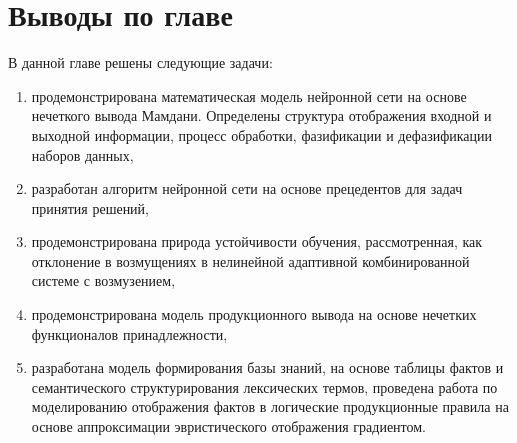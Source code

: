 \section{Выводы по главе}\label{sec:ch3/conc}
В данной главе решены следующие задачи:
\begin{enumerate}
    \item продемонстрирована математическая модель нейронной сети на основе нечеткого вывода Мамдани. Определены структура отображения входной и выходной информации, процесс обработки, фазификации и дефазификации наборов данных,
    \item разработан алгоритм нейронной сети на основе прецедентов для задач принятия решений,
    \item продемонстрирована природа устойчивости обучения, рассмотренная, как отклонение в возмущениях в нелинейной адаптивной комбинированной системе с возмузением,
    \item продемонстрирована модель продукционного вывода на основе нечетких функционалов принадлежности,
    \item разработана модель формирования базы знаний, на основе таблицы фактов и семантического структурирования лексических термов, проведена работа по моделированию отображения фактов в логические продукционные правила на основе аппроксимации эвристического отображения градиентом.
\end{enumerate}
\clearpage
